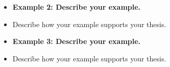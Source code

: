 \begin{enumerate}
\begin{itemize}
\hrulefill

\item \bf{Example 2:} Describe your example. \hrulefill

\hrulefill

\item Describe how your example supports your thesis. \hrulefill

\hrulefill

\item \bf{Example 3:} Describe your example. \hrulefill

\hrulefill

\item Describe how your example supports your thesis. \hrulefill

\hrulefill

\end{itemize}

\end{enumerate} 


